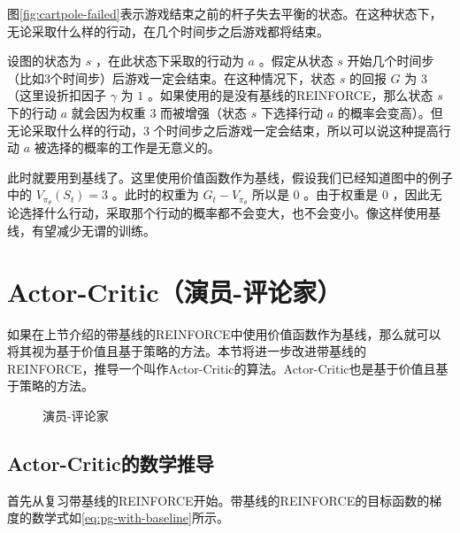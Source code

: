 \documentclass[lang=cn,newtx,10pt,scheme=chinese]{elegantbook}
\begin{document}
图\ref{fig:cartpole-failed}表示游戏结束之前的杆子失去平衡的状态。在这种状态下，无论采取什么样的行动，在几个时间步之后游戏都将结束。

设图的状态为 $s$ ，在此状态下采取的行动为 $a$ 。假定从状态 $s$ 开始几个时间步（比如3个时间步）后游戏一定会结束。在这种情况下，状态 $s$ 的回报 $G$ 为 $3$ （这里设折扣因子 $\gamma$ 为 $1$ 。如果使用的是没有基线的REINFORCE，那么状态 $s$ 下的行动 $a$ 就会因为权重 $3$ 而被增强（状态 $s$ 下选择行动 $a$ 的概率会变高）。但无论采取什么样的行动，3 个时间步之后游戏一定会结束，所以可以说这种提高行动 $a$ 被选择的概率的工作是无意义的。

此时就要用到基线了。这里使用价值函数作为基线，假设我们已经知道图中的例子中的 $V_{\pi_{\theta}}(S_t)=3$ 。此时的权重为 $G_t-V_{\pi_{\theta}}$ 所以是 0 。由于权重是 0 ，因此无论选择什么行动，采取那个行动的概率都不会变大，也不会变小。像这样使用基线，有望减少无谓的训练。

\section{Actor-Critic（演员-评论家）}

如果在上节介绍的带基线的REINFORCE中使用价值函数作为基线，那么就可以将其视为基于价值且基于策略的方法。本节将进一步改进带基线的REINFORCE，推导一个叫作Actor-Critic的算法。Actor-Critic也是基于价值且基于策略的方法。

\begin{figure}[!ht]
\centering
{}
\caption{演员-评论家}
\label{fig:actor-critic}
\end{figure}

\subsection{Actor-Critic的数学推导}

首先从复习带基线的REINFORCE开始。带基线的REINFORCE的目标函数的梯度的数学式如\ref{eq:pg-with-baseline}所示。
\end{document}
